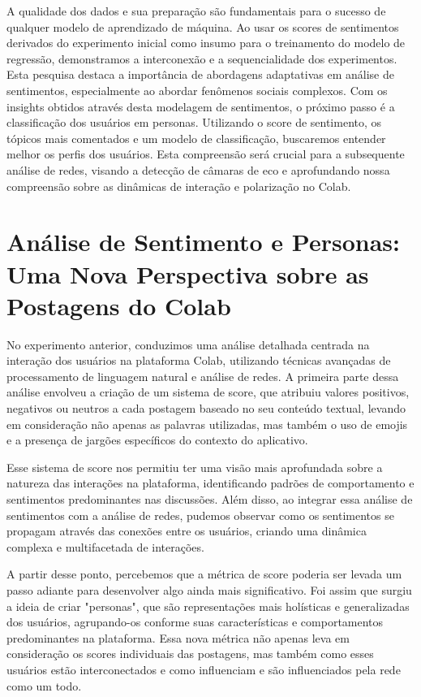 A qualidade dos dados e sua preparação são fundamentais para o sucesso de qualquer modelo de aprendizado de máquina. Ao usar os scores de sentimentos derivados do experimento inicial como insumo para o treinamento do modelo de regressão, demonstramos a interconexão e a sequencialidade dos experimentos. Esta pesquisa destaca a importância de abordagens adaptativas em análise de sentimentos, especialmente ao abordar fenômenos sociais complexos. Com os insights obtidos através desta modelagem de sentimentos, o próximo passo é a classificação dos usuários em personas. Utilizando o score de sentimento, os tópicos mais comentados e um modelo de classificação, buscaremos entender melhor os perfis dos usuários. Esta compreensão será crucial para a subsequente análise de redes, visando a detecção de câmaras de eco e aprofundando nossa compreensão sobre as dinâmicas de interação e polarização no Colab.

\section{Análise de Sentimento e Personas: Uma Nova Perspectiva sobre as Postagens do Colab}

No experimento anterior, conduzimos uma análise detalhada centrada na interação dos usuários na plataforma Colab, utilizando técnicas avançadas de processamento de linguagem natural e análise de redes. A primeira parte dessa análise envolveu a criação de um sistema de score, que atribuiu valores positivos, negativos ou neutros a cada postagem baseado no seu conteúdo textual, levando em consideração não apenas as palavras utilizadas, mas também o uso de emojis e a presença de jargões específicos do contexto do aplicativo.

Esse sistema de score nos permitiu ter uma visão mais aprofundada sobre a natureza das interações na plataforma, identificando padrões de comportamento e sentimentos predominantes nas discussões. Além disso, ao integrar essa análise de sentimentos com a análise de redes, pudemos observar como os sentimentos se propagam através das conexões entre os usuários, criando uma dinâmica complexa e multifacetada de interações.

A partir desse ponto, percebemos que a métrica de score poderia ser levada um passo adiante para desenvolver algo ainda mais significativo. Foi assim que surgiu a ideia de criar "personas", que são representações mais holísticas e generalizadas dos usuários, agrupando-os conforme suas características e comportamentos predominantes na plataforma. Essa nova métrica não apenas leva em consideração os scores individuais das postagens, mas também como esses usuários estão interconectados e como influenciam e são influenciados pela rede como um todo.

